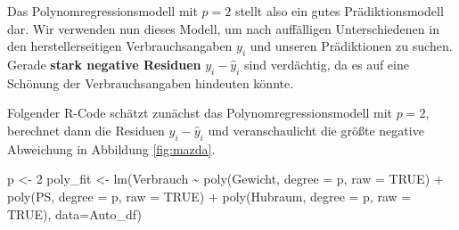 \documentclass[
  ngerman,
]{book}
\newenvironment{Shaded}{\begin{snugshade}}{\end{snugshade}}
\newcommand{\AttributeTok}[1]{\textcolor[rgb]{0.77,0.63,0.00}{#1}}
\newcommand{\ConstantTok}[1]{\textcolor[rgb]{0.00,0.00,0.00}{#1}}
\newcommand{\DecValTok}[1]{\textcolor[rgb]{0.00,0.00,0.81}{#1}}
\newcommand{\FunctionTok}[1]{\textcolor[rgb]{0.00,0.00,0.00}{#1}}
\newcommand{\NormalTok}[1]{#1}
\newcommand{\OtherTok}[1]{\textcolor[rgb]{0.56,0.35,0.01}{#1}}
\newcommand{\SpecialCharTok}[1]{\textcolor[rgb]{0.00,0.00,0.00}{#1}}
\begin{document}
Das Polynomregressionsmodell mit \(p=2\) stellt also ein gutes Prädiktionsmodell dar. Wir verwenden nun dieses Modell, um nach auffälligen Unterschiedenen in den herstellerseitigen Verbrauchsangaben \(y_i\) und unseren Prädiktionen zu suchen. Gerade \textbf{stark negative Residuen} \(y_i-\hat{y}_i\) sind verdächtig, da es auf eine Schönung der Verbrauchsangaben hindeuten könnte.

Folgender R-Code schätzt zunächst das Polynomregressionsmodell mit \(p=2\), berechnet dann die Residuen \(y_i-\hat{y}_i\) und veranschaulicht die größte negative Abweichung in Abbildung \ref{fig:mazda}.

\begin{Shaded}
\begin{Highlighting}[]

\NormalTok{p }\OtherTok{\textless{}{-}} \DecValTok{2}
\NormalTok{poly\_fit }\OtherTok{\textless{}{-}} \FunctionTok{lm}\NormalTok{(Verbrauch }\SpecialCharTok{\textasciitilde{}}
                   \FunctionTok{poly}\NormalTok{(Gewicht,        }\AttributeTok{degree =}\NormalTok{ p, }\AttributeTok{raw =} \ConstantTok{TRUE}\NormalTok{) }\SpecialCharTok{+}
                   \FunctionTok{poly}\NormalTok{(PS,             }\AttributeTok{degree =}\NormalTok{ p, }\AttributeTok{raw =} \ConstantTok{TRUE}\NormalTok{) }\SpecialCharTok{+}
                   \FunctionTok{poly}\NormalTok{(Hubraum,        }\AttributeTok{degree =}\NormalTok{ p, }\AttributeTok{raw =} \ConstantTok{TRUE}\NormalTok{),}
                 \AttributeTok{data=}\NormalTok{Auto\_df)}


\end{Highlighting}
\end{Shaded}
\end{document}
